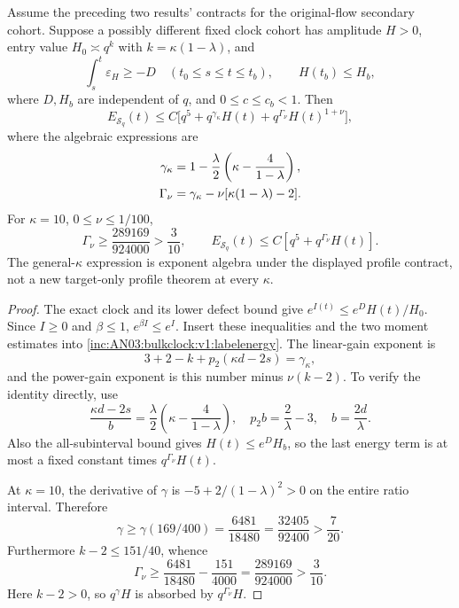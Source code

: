 \documentclass[11pt]{article}
\theoremstyle{remark}\newtheorem{remark}[theorem]{Remark}
\newcommand{\Sec}{\mathcal S_q}
\begin{document}
\begin{corollary}
\label{inc:AN03:bulkclock:v1:secondary}
Assume the preceding two results' contracts for the original-flow secondary cohort. Suppose a possibly different fixed clock cohort has amplitude $H>0$, entry value $H_0\asymp q^k$ with $k=\kappa(1-\lambda)$, and
\[
 \int_s^t\varepsilon_H\ge-D\quad(t_0\le s\le t\le t_b),\qquad
 H(t_b)\le H_b,
\]
where $D,H_b$ are independent of $q$, and $0\le c\le c_b<1$. Then
\begin{equation}\label{inc:AN03:bulkclock:v1:secondarydetail}
 E_{\Sec}(t)\le C\big[q^5+q^{\gamma_\kappa}H(t)
          +q^{\Gamma_\nu}H(t)^{1+\nu}\big],
\end{equation}
where the algebraic expressions are
\begin{align}
 \gamma_\kappa&=1-\frac\lambda2\left(\kappa-\frac4{1-\lambda}\right),\notag\\
 \Gamma_\nu&=\gamma_\kappa-\nu[\kappa(1-\lambda)-2].
 \label{inc:AN03:bulkclock:v1:gamma}
\end{align}
For $\kappa=10$, $0\le\nu\le1/100$,
\begin{equation}\label{inc:AN03:bulkclock:v1:gammamargin}
 \Gamma_\nu\ge\frac{289169}{924000}>\frac3{10},\qquad
 E_{\Sec}(t)\le C[q^5+q^{\Gamma_\nu}H(t)].
\end{equation}
The general-$\kappa$ expression is exponent algebra under the displayed profile contract, not a new target-only profile theorem at every $\kappa$.
\end{corollary}
\begin{proof}
The exact clock and its lower defect bound give $e^{I(t)}\le e^D H(t)/H_0$. Since $I\ge0$ and $\beta\le1$, $e^{\beta I}\le e^I$. Insert these inequalities and the two moment estimates into \eqref{inc:AN03:bulkclock:v1:labelenergy}. The linear-gain exponent is
\[
 3+2-k+p_2(\kappa d-2s)=\gamma_\kappa,
\]
and the power-gain exponent is this number minus $\nu(k-2)$. To verify the identity directly, use
\[
 \frac{\kappa d-2s}{b}=\frac\lambda2\left(\kappa-\frac4{1-\lambda}\right),
 \quad p_2b=\frac2\lambda-3,\quad b=\frac{2d}{\lambda}.
\]
Also the all-subinterval bound gives $H(t)\le e^D H_b$, so the last energy term is at most a fixed constant times $q^{\Gamma_\nu}H(t)$.

At $\kappa=10$, the derivative of $\gamma$ is $-5+2/(1-\lambda)^2>0$ on the entire ratio interval. Therefore
\[
 \gamma\ge\gamma(169/400)=\frac{6481}{18480}=\frac{32405}{92400}>\frac7{20}.
\]
Furthermore $k-2\le151/40$, whence
\[
 \Gamma_\nu\ge\frac{6481}{18480}-\frac{151}{4000}
 =\frac{289169}{924000}>\frac3{10}.
\]
Here $k-2>0$, so $q^{\gamma}H$ is absorbed by $q^{\Gamma_\nu}H$.
\end{proof}
\end{document}
